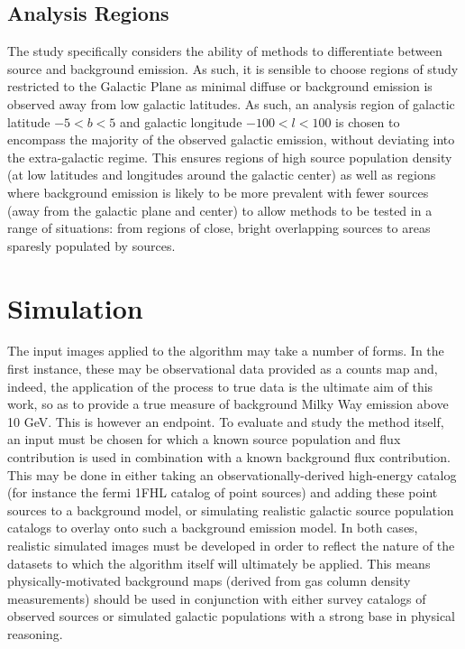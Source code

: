 \documentclass{PoS}
\begin{document}
\subsection{Analysis Regions}

The study specifically considers the ability of methods to differentiate between source and background emission. As such, it is sensible to choose regions of study restricted to the Galactic Plane as minimal diffuse or background emission is observed away from low galactic latitudes. As such, an analysis region of galactic latitude $-5 < b < 5$ and galactic longitude $-100 < l < 100$ is chosen to encompass the majority of the observed galactic emission, without deviating into the extra-galactic regime. This ensures regions of high source population density (at low latitudes and longitudes around the galactic center) as well as regions where background emission is likely to be more prevalent with fewer sources (away from the galactic plane and center) to allow methods to be tested in a range of situations: from regions of close, bright overlapping sources to areas sparesly populated by sources.

\section{Simulation}


The input images applied to the algorithm may take a number of forms. In the first instance, these may be observational data provided as a counts map and, indeed, the application of the process to true data is the ultimate aim of this work, so as to provide a true measure of background Milky Way emission above 10 GeV. This is however an endpoint. To evaluate and study the method itself, an input must be chosen for which a known source population and flux contribution is used in combination with a known background flux contribution. This may be done in either taking an observationally-derived high-energy catalog (for instance the fermi 1FHL catalog of point sources) and adding these point sources to a background model, or simulating realistic galactic source population catalogs to overlay onto such a background emission model. In both cases, realistic simulated images must be developed in order to reflect the nature of the datasets to which the algorithm itself will ultimately be applied. This means physically-motivated background maps (derived from gas column density measurements) should be used in conjunction with either survey catalogs of observed sources or simulated galactic populations with a strong base in physical reasoning.
\end{document}

